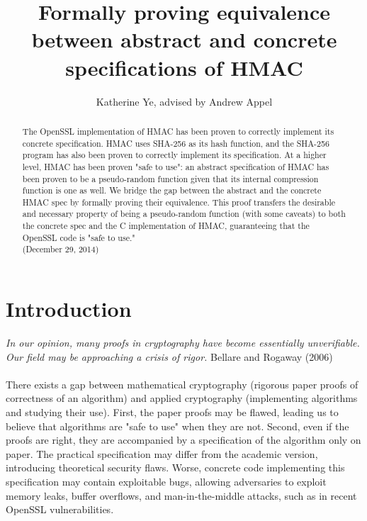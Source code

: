 \documentclass[twocolumn,showpacs,%
  nofootinbib,aps,superscriptaddress,%
  eqsecnum,prd,notitlepage,showkeys,10pt]{revtex4-1}
\begin{document}
\title{Formally proving equivalence between abstract and concrete specifications of HMAC}
\author{Katherine Ye, advised by Andrew Appel}

\begin{abstract}
The OpenSSL implementation of HMAC has been proven to correctly implement its concrete specification. HMAC uses SHA-256 as its hash function, and the SHA-256 program has also been proven to correctly implement its specification. At a higher level, HMAC has been proven "safe to use": an abstract specification of HMAC has been proven to be a pseudo-random function given that its internal compression function is one as well. We bridge the gap between the abstract and the concrete HMAC spec by formally proving their equivalence. This proof transfers the desirable and necessary property of being a pseudo-random function (with some caveats) to both the concrete spec and the C implementation of HMAC, guaranteeing that the OpenSSL code is "safe to use."
\\
\indent
(December 29, 2014)

\end{abstract}

\maketitle


\section{Introduction}

{\it In our opinion, many proofs in cryptography have become essentially unverifiable. Our field may be approaching a crisis of rigor.}  
Bellare and Rogaway (2006) \\
\\
There exists a gap between mathematical cryptography (rigorous paper proofs of correctness of an algorithm) and applied cryptography (implementing algorithms and studying their use). First, the paper proofs may be flawed, leading us to believe that algorithms are "safe to use" when they are not. Second, even if the proofs are right, they are accompanied by a specification of the algorithm only on paper. The practical specification may differ from the academic version, introducing theoretical security flaws. Worse, concrete code implementing this specification may contain exploitable bugs, allowing adversaries to exploit memory leaks, buffer overflows, and man-in-the-middle attacks, such as in recent OpenSSL vulnerabilities.
\end{document}
